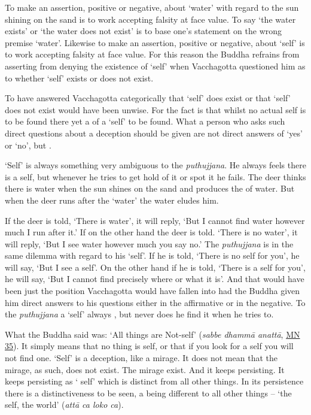 To make an assertion, positive or negative, about `water' with regard to the sun shining on the sand is to work accepting falsity at face value. To say `the water exists' or `the water does not exist' is to base one's statement on the wrong premise `water'. Likewise to make an assertion, positive or negative, about `self' is to work accepting falsity at face value. For this reason the Buddha refrains  from asserting  from denying the existence of `self' when Vacchagotta questioned him as to whether `self' exists or does not exist.

To have answered Vacchagotta categorically that `self' does exist or that `self' does not exist would have been unwise. For the fact is that whilst no actual self is to be found there yet  a  of a `self' to be found. What a person who asks such direct questions about a deception should be given are not direct answers of `yes' or `no', but .

`Self' is always something very ambiguous to the \emph{puthujjana}. He always feels there is a self, but whenever he tries to get hold of it or spot it he fails. The deer thinks there is water when the sun shines on the sand and produces the  of water. But when the deer runs after the `water' the water eludes him.

If the deer is told, `There is water', it will reply, `But I cannot find water however much I run after it.' If on the other hand the deer is told. `There is no water', it will reply, `But I see water however much you say no.' The \emph{puthujjana} is in the same dilemma with regard to his `self'. If he is told, `There is no self for you', he will say, `But I see a self'. On the other hand if he is told, `There is a self for you', he will say, `But I cannot find precisely where or what it is'. And that would have been just the position Vacchagotta would have fallen into had the Buddha given him direct answers to his questions either in the affirmative or in the negative. To the \emph{puthujjana} a `self' always , but never does he find it when he tries to.

What the Buddha said was: `All things are Not-self' (\emph{sabbe dhammā anattā}, \href{https://suttacentral.net/mn35/en/sujato}{MN 35}). It simply means that no thing is self, or that if you look for a self you will not find one. `Self' is a deception, like a mirage. It does not mean that the mirage, as such, does not exist. The mirage  exist. And it keeps persisting. It keeps persisting as ` self' which is distinct from all other things. In its persistence there is a distinctiveness to be seen, a being different to all other things -- `the self, the world' (\emph{attā ca loko ca}).

